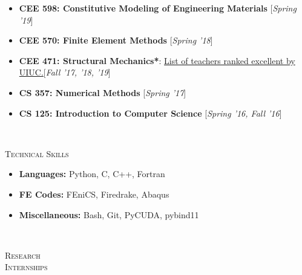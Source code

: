 \documentclass[10pt]{article}
\begin{document}
\begin{minipage}[t]{0.85\linewidth}
	\vspace{-1em}
	\begin{itemize}[itemsep=-1pt]
		\item {\bf CEE 598: Constitutive Modeling of Engineering Materials} \hfill [\textsl{Spring '19}]
		\item {\bf CEE 570: Finite Element Methods} \hfill [\textsl{Spring '18}]
		\item {\bf CEE 471: Structural Mechanics*}: \href{https://citl.illinois.edu/docs/default-source/teachers-ranked-as-excellent/tre-2017-fall.pdf}{List of teachers ranked excellent by UIUC.}\hfill [\textsl{Fall '17, '18, '19}]
		\item {\bf CS 357: Numerical Methods} \hfill [\textsl{Spring '17}]
		\item {\bf CS 125: Introduction to Computer Science} \hfill [\textsl{Spring '16, Fall '16}] 
	\end{itemize}
\end{minipage}\\[3mm]
\begin{minipage}{0.15\linewidth}
	\textsc{Technical Skills}
\end{minipage}\hfill
\begin{minipage}[t]{0.85\linewidth}
	\vspace{-1.5em}
	\begin{itemize}[itemsep=-1pt, label={}]
		\item {\bf Languages: }Python, C, C++, Fortran
		\item {\bf FE Codes: }FEniCS, Firedrake, Abaqus
		\item {\bf Miscellaneous: }Bash, Git, PyCUDA, pybind11
	\end{itemize}
\end{minipage}\\[3mm]
\begin{minipage}{0.15\linewidth}
\textsc{Research\\ Internships}
\end{minipage}\hfill
\end{document}

